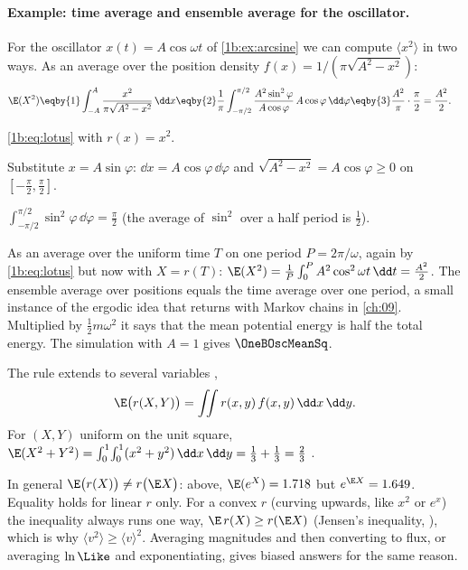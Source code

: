 \paragraph{Example: time average and ensemble average for the oscillator.}
For the oscillator $x(t)=A\cos\omega t$ of \cref{1b:ex:arcsine} we can compute
$\langle x^2\rangle$ in two ways. As an average over the position density
$f(x)=1/(\pi\sqrt{A^2-x^2})$:
\begin{align*}
  \E(X^2)
  &\eqby{1} \int_{-A}^{A}\frac{x^2}{\pi\sqrt{A^2-x^2}}\,\dd x
   \eqby{2} \frac1\pi\int_{-\pi/2}^{\pi/2}\frac{A^2\sin^2\varphi}{A\cos\varphi}\,A\cos\varphi\,\dd\varphi
   \eqby{3} \frac{A^2}{\pi}\cdot\frac\pi2=\frac{A^2}{2} .
\end{align*}
\begin{explain}
  \item \eqref{1b:eq:lotus} with $r(x)=x^2$.
  \item Substitute $x=A\sin\varphi$: $\dd x=A\cos\varphi\,\dd\varphi$ and
        $\sqrt{A^2-x^2}=A\cos\varphi\ge0$ on $[-\tfrac\pi2,\tfrac\pi2]$.
  \item $\int_{-\pi/2}^{\pi/2}\sin^2\varphi\,\dd\varphi=\tfrac\pi2$ (the average
        of $\sin^2$ over a half period is $\tfrac12$).
\end{explain}
As an average over the uniform time $T$ on one period $P=2\pi/\omega$, again
by \eqref{1b:eq:lotus} but now with $X=r(T)$:
$\E(X^2)=\frac1P\int_0^PA^2\cos^2\omega t\,\dd t=\frac{A^2}{2}$. The ensemble
average over positions equals the time average over one period, a small
instance of the ergodic idea that returns with Markov chains in \cref{ch:09}.
Multiplied by $\tfrac12m\omega^2$ it says that the mean potential energy is half
the total energy. The simulation with $A=1$ gives $\OneBOscMeanSq$.

The rule extends to several variables ,
\[
  \E\bigl(r(X,Y)\bigr)=\iint r(x,y)\,f(x,y)\,\dd x\,\dd y .
\]
For $(X,Y)$ uniform on the unit square,
$\E(X^2+Y^2)=\int_0^1\!\int_0^1(x^2+y^2)\,\dd x\,\dd y=\tfrac13+\tfrac13=\tfrac23$
.

\begin{pitfall}
In general $\E\bigl(r(X)\bigr)\neq r\bigl(\E X\bigr)$: above,
$\E(e^X)=1.718$ but $e^{\E X}=1.649$. Equality holds for linear $r$ only. For
a convex $r$ (curving upwards, like $x^2$ or $e^x$) the inequality always runs
one way, $\E\,r(X)\ge r(\E X)$ (Jensen's inequality,
), which is why $\langle v^2\rangle\ge\langle
v\rangle^2$. Averaging magnitudes and then converting to flux, or averaging
$\ln\Like$ and exponentiating, gives biased answers for the same reason.
\end{pitfall}

